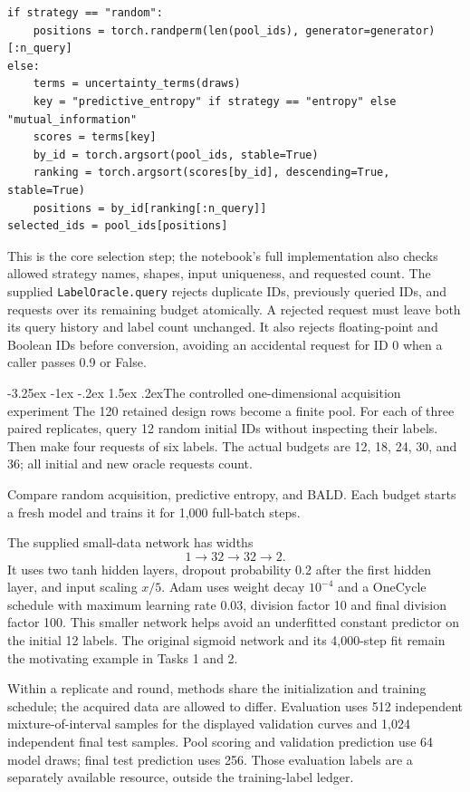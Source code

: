 \documentclass[11pt,a4paper]{article}
\makeatletter
\renewcommand\subsection{\@startsection{subsection}{2}{\z@}%
  {-3.25ex \@plus -1ex \@minus -.2ex}%
  {1.5ex \@plus .2ex}{\normalfont\large}}
\makeatother
\begin{document}
\begin{lstlisting}
if strategy == "random":
    positions = torch.randperm(len(pool_ids), generator=generator)[:n_query]
else:
    terms = uncertainty_terms(draws)
    key = "predictive_entropy" if strategy == "entropy" else "mutual_information"
    scores = terms[key]
    by_id = torch.argsort(pool_ids, stable=True)
    ranking = torch.argsort(scores[by_id], descending=True, stable=True)
    positions = by_id[ranking[:n_query]]
selected_ids = pool_ids[positions]
\end{lstlisting}
This is the core selection step; the notebook's full implementation also
checks allowed strategy names, shapes, input uniqueness, and requested count.
The supplied \texttt{LabelOracle.query} rejects duplicate IDs, previously
queried IDs, and requests over its remaining budget atomically. A rejected
request must leave both its query history and label count unchanged.
It also rejects floating-point and Boolean IDs before conversion, avoiding
an accidental request for ID 0 when a caller passes 0.9 or False.

\subsection{The controlled one-dimensional acquisition experiment}
The 120 retained design rows become a finite pool. For each of three paired
replicates, query 12 random initial IDs without inspecting their labels.
Then make four requests of six labels. The actual budgets are
12, 18, 24, 30, and 36; all initial and new oracle requests count.

Compare random acquisition, predictive entropy, and BALD. Each budget starts
a fresh model and trains it for 1,000 full-batch steps.

The supplied small-data network has widths
\[
1\to32\to32\to2.
\]
It uses two tanh hidden layers, dropout probability 0.2 after
the first hidden layer, and input scaling $x/5$. Adam uses weight decay
$10^{-4}$ and a OneCycle schedule with maximum learning rate 0.03,
division factor 10 and final division factor 100. This smaller network
helps avoid an underfitted constant predictor on the initial 12 labels.
The original sigmoid network and its 4,000-step fit remain the motivating
example in Tasks 1 and 2.

Within a replicate
and round, methods share the initialization and training schedule; the
acquired data are allowed to differ. Evaluation uses 512 independent
mixture-of-interval samples for the displayed validation curves and 1,024
independent final test samples. Pool scoring and validation prediction use
64 model draws; final test prediction uses 256. Those evaluation labels are a separately
available resource, outside the training-label ledger.
\end{document}
